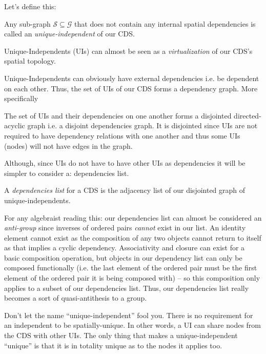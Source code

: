Let's define this:

\begin{con-def}
	\label{independents}
	Any sub-graph $\mathcal{S} \subseteq \mathcal{G}$ that does not contain any internal spatial dependencies is called an \textit{unique-independent} of our CDS.
\end{con-def}

Unique-Independents (UIs) can almost be seen as a \textit{virtualization} of our CDS's spatial topology.

Unique-Independents can obviously have external dependencies i.e. be dependent on each other. Thus, the set of UIs of our CDS forms a dependency graph. More specifically

\begin{con-def}
	\label{ddag}
	The set of UIs and their dependencies on one another forms a disjointed directed-acyclic graph i.e. a disjoint dependencies graph. It is disjointed since UIs are not required to have dependency relations with one another and thus some UIs (nodes) will not have edges in the graph.
\end{con-def}


Although, since UIs do not have to have other UIs as dependencies it will be simpler to consider a: dependencies list.

\begin{con-def}
	\label{dependency-list}
	A \textit{dependencies list} for a CDS is the adjacency list of our disjointed graph of unique-independents.
\end{con-def}

\if
For any algebraist reading this: our dependencies list can almost be considered an \textit{anti-group} since inverses of ordered pairs \textit{cannot} exist in our list. An identity element cannot exist as the composition of any two objects cannot return to itself as that implies a cyclic dependency. Associativity and closure can exist for a basic composition operation, but objects in our dependency list can only be composed functionally (i.e. the last element of the ordered pair must be the first element of the ordered pair it is being composed with) -- so this composition only applies to a subset of our dependencies list. Thus, our dependencies list really becomes a sort of quasi-antithesis to a group.
\fi

Don't let the name ``unique-independent'' fool you. There is no requirement for an independent to be spatially-unique. In other words, a UI can share nodes from the CDS with other UIs. The only thing that makes a unique-independent ``unique'' is that it is in totality unique as to the nodes it applies too. 


